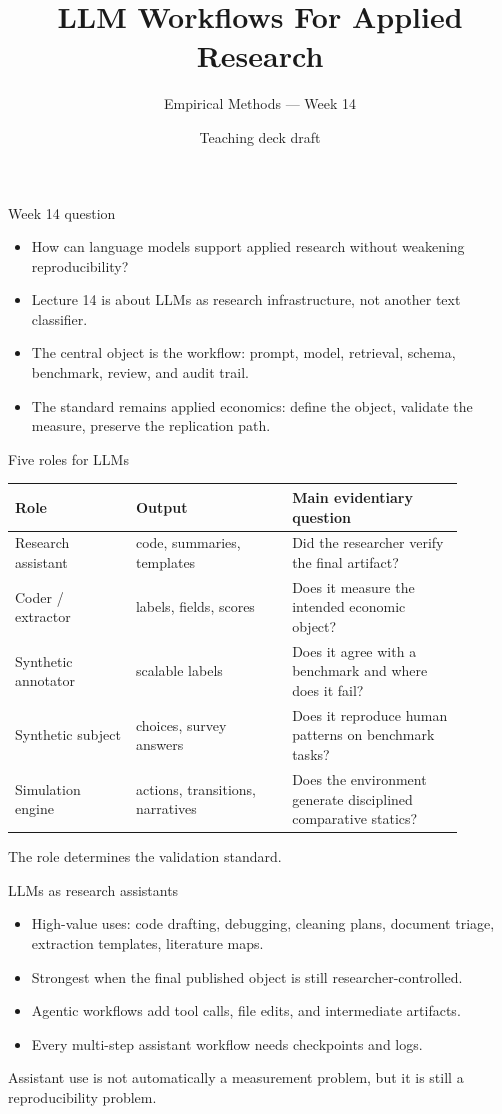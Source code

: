 \documentclass[aspectratio=169,11pt]{beamer}
\title{LLM Workflows For Applied Research}
\subtitle{Empirical Methods --- Week 14}
\author{Teaching deck draft}
\date{}
\newcommand{\1}{\mathbf{1}}
\begin{document}
\begin{frame}
  \titlepage
\end{frame}

\begin{frame}{Week 14 question}
\begin{itemize}
    \item How can language models support applied research without weakening reproducibility?
    \item Lecture 14 is about LLMs as research infrastructure, not another text classifier.
    \item The central object is the workflow: prompt, model, retrieval, schema, benchmark, review, and audit trail.
    \item The standard remains applied economics: define the object, validate the measure, preserve the replication path.
\end{itemize}
\end{frame}

\begin{frame}{Five roles for LLMs}
\small
\begin{tabular}{p{0.24\linewidth} p{0.31\linewidth} p{0.34\linewidth}}
\toprule
Role & Output & Main evidentiary question \\
\midrule
Research assistant & code, summaries, templates & Did the researcher verify the final artifact? \\
Coder / extractor & labels, fields, scores & Does it measure the intended economic object? \\
Synthetic annotator & scalable labels & Does it agree with a benchmark and where does it fail? \\
Synthetic subject & choices, survey answers & Does it reproduce human patterns on benchmark tasks? \\
Simulation engine & actions, transitions, narratives & Does the environment generate disciplined comparative statics? \\
\bottomrule
\end{tabular}

\medskip
The role determines the validation standard.
\end{frame}

\begin{frame}{LLMs as research assistants}
\begin{itemize}
    \item High-value uses: code drafting, debugging, cleaning plans, document triage, extraction templates, literature maps.
    \item Strongest when the final published object is still researcher-controlled.
    \item Agentic workflows add tool calls, file edits, and intermediate artifacts.
    \item Every multi-step assistant workflow needs checkpoints and logs.
\end{itemize}

\medskip
Assistant use is not automatically a measurement problem, but it is still a reproducibility problem.
\end{frame}
\end{document}
